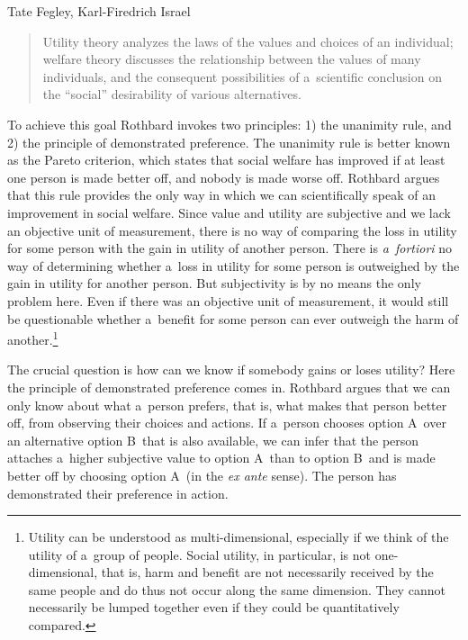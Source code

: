\begin{artengenv2auth}{Tate Fegley, Karl-Firedrich Israel}
\begin{quote}
Utility theory analyzes the laws of the values and choices of an individual; welfare theory discusses the relationship between the values of many individuals, and the consequent possibilities of a~scientific conclusion on the ``social'' desirability of various alternatives. 
\parencite[][p.289]{rothbard_toward_2011}%
\end{quote}




To achieve this goal Rothbard invokes two principles: 1) the unanimity rule, and 2) the principle of demonstrated preference. The unanimity rule is better known as the Pareto criterion, which states that social welfare has improved if at least one person is made better off, and nobody is made worse off. Rothbard argues that this rule provides the only way in which we can scientifically speak of an improvement in social welfare. Since value and utility are subjective and we lack an objective unit of measurement, there is no way of comparing the loss in utility for some person with the gain in utility of another person. There is \textit{a~fortiori} no way of determining whether a~loss in utility for some person is outweighed by the gain in utility for another person. But subjectivity is by no means the only problem here. Even if there was an objective unit of measurement, it would still be questionable whether a~benefit for some person can ever outweigh the harm of another.\footnote{Utility can be understood as multi-dimensional, especially if we think of the utility of a~group of people. Social utility, in particular, is not one-dimensional, that is, harm and benefit are not necessarily received by the same people and do thus not occur along the same dimension. They cannot necessarily be lumped together even if they could be quantitatively compared. }



The crucial question is how can we know if somebody gains or loses utility? Here the principle of demonstrated preference comes in. Rothbard argues that we can only know about what a~person prefers, that is, what makes that person better off, from observing their choices and actions. If a~person chooses option A~over an alternative option B~that is also available, we can infer that the person attaches a~higher subjective value to option A~than to option B~and is made better off by choosing option A~(in the \textit{ex ante} sense). The person has demonstrated their preference in action.




\end{artengenv2auth}

